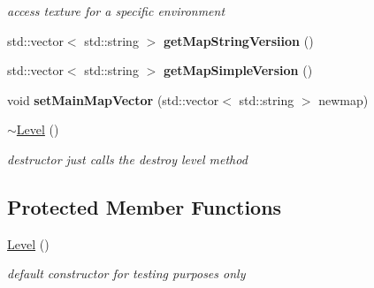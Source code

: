 \begin{DoxyCompactItemize}
\begin{DoxyCompactList}\small\item\em access texture for a specific environment \end{DoxyCompactList}\item 
\hypertarget{class_level_a3ca47ac48d1454c5f68a3c61b8073ce1}{}\label{class_level_a3ca47ac48d1454c5f68a3c61b8073ce1} 
std\+::vector$<$ std\+::string $>$ {\bfseries get\+Map\+String\+Versiion} ()
\item 
\hypertarget{class_level_a36e2b0bc3c817fa70eb4b618edcb6d70}{}\label{class_level_a36e2b0bc3c817fa70eb4b618edcb6d70} 
std\+::vector$<$ std\+::string $>$ {\bfseries get\+Map\+Simple\+Version} ()
\item 
\hypertarget{class_level_a5087842ccd1a2b5f1e4dc0bab6d6823c}{}\label{class_level_a5087842ccd1a2b5f1e4dc0bab6d6823c} 
void {\bfseries set\+Main\+Map\+Vector} (std\+::vector$<$ std\+::string $>$ newmap)
\item 
\hypertarget{class_level_a249eac1e8f19ff44134efa5e986feaca}{}\label{class_level_a249eac1e8f19ff44134efa5e986feaca} 
\hyperlink{class_level_a249eac1e8f19ff44134efa5e986feaca}{$\sim$\+Level} ()
\begin{DoxyCompactList}\small\item\em destructor just calls the destroy level method \end{DoxyCompactList}\end{DoxyCompactItemize}
\subsection*{Protected Member Functions}
\begin{DoxyCompactItemize}
\item 
\hypertarget{class_level_a7a696c928ca5d5354db6e50e46d0f67d}{}\label{class_level_a7a696c928ca5d5354db6e50e46d0f67d} 
\hyperlink{class_level_a7a696c928ca5d5354db6e50e46d0f67d}{Level} ()
\begin{DoxyCompactList}\small\item\em default constructor for testing purposes only \end{DoxyCompactList}\end{DoxyCompactItemize}
